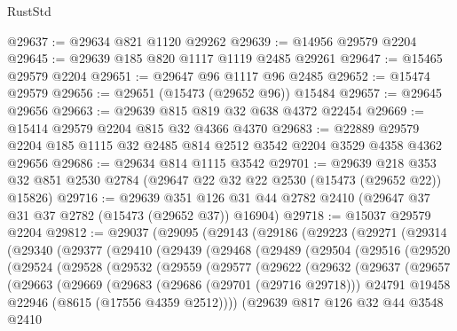 \begin{lexlean}{RustStd}
\begin{coremodule}
@29637 := @29634 @821 @1120 @29262
@29639 := @14956 @29579 @2204
@29645 := @29639 @185 @820 @1117 @1119 @2485 @29261
@29647 := @15465 @29579 @2204
@29651 := @29647 @96 @1117 @96 @2485
@29652 := @15474 @29579
@29656 := @29651 (@15473 (@29652 @96)) @15484
@29657 := @29645 @29656
@29663 := @29639 @815 @819 @32 @638 @4372 @22454
@29669 := @15414 @29579 @2204 @815 @32 @4366 @4370
@29683 := @22889 @29579 @2204 @185 @1115 @32 @2485 @814 @2512 @3542 @2204 @3529 @4358 @4362 @29656
@29686 := @29634 @814 @1115 @3542
@29701 := @29639
    @218
    @353
    @32
    @851
    @2530
    @2784
    (@29647 @22 @32 @22 @2530 (@15473 (@29652 @22)) @15826)
@29716 := @29639
    @351
    @126
    @31
    @44
    @2782
    @2410
    (@29647 @37 @31 @37 @2782 (@15473 (@29652 @37)) @16904)
@29718 := @15037 @29579 @2204
@29812 := @29037
    (@29095
      (@29143
        (@29186
          (@29223
            (@29271
              (@29314
                (@29340
                  (@29377
                    (@29410
                      (@29439
                        (@29468
                          (@29489
                            (@29504
                              (@29516
                                (@29520
                                  (@29524
                                    (@29528
                                      (@29532
                                        (@29559
                                          (@29577
                                            (@29622
                                              (@29632
                                                (@29637
                                                  (@29657
                                                    (@29663
                                                      (@29669
                                                        (@29683
                                                          (@29686 (@29701 (@29716 @29718)))
                                                          @24791
                                                          @19458
                                                          @22946
                                                          (@8615 (@17556 @4359 @2512))))
                                                      (@29639
                                                        @817
                                                        @126
                                                        @32
                                                        @44
                                                        @3548
                                                        @2410

\end{coremodule}
\end{lexlean}
